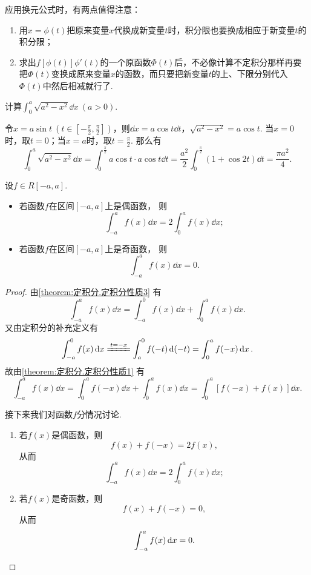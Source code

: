 应用换元公式时，有两点值得注意：\begin{enumerate}
\item 用\(x = \phi(t)\)把原来变量\(x\)代换成新变量\(t\)时，积分限也要换成相应于新变量\(t\)的积分限；
\item 求出\(f[\phi(t)] \phi'(t)\)的一个原函数\(\Phi(t)\)后，不必像计算不定积分那样再要把\(\Phi(t)\)变换成原来变量\(x\)的函数，而只要把新变量\(t\)的上、下限分别代入\(\Phi(t)\)中然后相减就行了.
\end{enumerate}

\begin{example}
计算\(\int_0^a{\sqrt{a^2-x^2} \dd{x}}\ (a > 0)\).
\begin{solution}
令\(x = a \sin t\ (t \in [-\frac{\pi}{2},\frac{\pi}{2}])\)，则\(\dd{x} = a \cos t \dd{t}\)，\(\sqrt{a^2-x^2} = a \cos t\).
当\(x = 0\)时，取\(t = 0\)；当\(x = a\)时，取\(t = \frac{\pi}{2}\).
那么有\[
\int_0^a{\sqrt{a^2-x^2} \dd{x}}
= \int_0^{\frac{\pi}{2}}{a \cos t \cdot a \cos t \dd{t}}
= \frac{a^2}{2} \int_0^{\frac{\pi}{2}}{(1+\cos 2 t) \dd{t}}
= \frac{\pi a^2}{4}.
\]
\end{solution}
\end{example}

\begin{proposition}\label{theorem:定积分.利用对称性简化计算1}
设\(f \in R[-a,a]\).
\begin{itemize}
	\item 若函数\(f\)在区间\([-a,a]\)上是偶函数，
	则\[
		\int_{-a}^a f(x) \dd{x}
		= 2 \int_0^a f(x) \dd{x};
	\]

	\item 若函数\(f\)在区间\([-a,a]\)上是奇函数，
	则\[
		\int_{-a}^a f(x) \dd{x} = 0.
	\]
\end{itemize}
\begin{proof}
由\cref{theorem:定积分.定积分性质3} 有\[
	\int_{-a}^a f(x) \dd{x}
	= \int_{-a}^0 f(x) \dd{x} + \int_0^a f(x) \dd{x}.
\]
又由定积分的补充定义有\[
	\int_{-a}^0 f(x) \dd{x}
	\xlongequal{t=-x} \int_a^0 f(-t) \dd(-t)
	= \int_0^a f(-x) \dd{x}.
\]
故由\cref{theorem:定积分.定积分性质1} 有\[
	\int_{-a}^a f(x) \dd{x}
	= \int_0^a f(-x) \dd{x} + \int_0^a f(x) \dd{x}
	= \int_0^a [f(-x) + f(x)] \dd{x}.
\]

接下来我们对函数\(f\)分情况讨论.
\begin{enumerate}
	\item 若\(f(x)\)是偶函数，则\[
		f(x) + f(-x) = 2 f(x),
	\]
	从而\[
		\int_{-a}^a f(x) \dd{x} = 2 \int_0^a f(x) \dd{x};
	\]

	\item 若\(f(x)\)是奇函数，则\[
		f(x) + f(-x) = 0,
	\]
	从而\[
		\int_{-a}^a f(x) \dd{x} = 0.
		\qedhere
	\]
\end{enumerate}
\end{proof}
\end{proposition}

